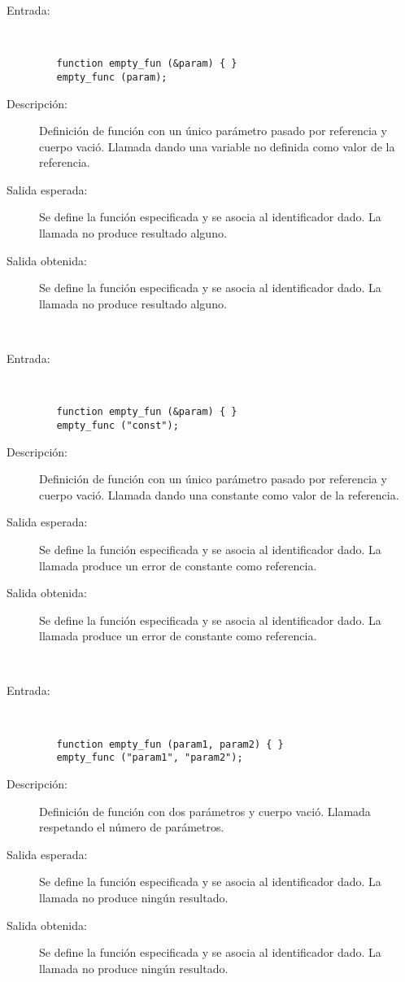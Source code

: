 	\begin{description}
		\item [Entrada:] \hfill \\
\begin{lstlisting}
   function empty_fun (&param) { } 
   empty_func (param);
\end{lstlisting}
		\item [Descripción:] Definición de función con un único parámetro pasado por referencia y cuerpo vació. Llamada dando una variable no definida como valor de la referencia.
		\item [Salida esperada:] Se define la función especificada y se asocia al identificador dado. La llamada no produce resultado alguno.
		\item [Salida obtenida:] Se define la función especificada y se asocia al identificador dado. La llamada no produce resultado alguno.
	\end{description}
\hfil \\
	\begin{description}
		\item [Entrada:] \hfill \\
\begin{lstlisting}
   function empty_fun (&param) { } 
   empty_func ("const");
\end{lstlisting}
		\item [Descripción:] Definición de función con un único parámetro pasado por referencia y cuerpo vació. Llamada dando una constante como valor de la referencia.
		\item [Salida esperada:] Se define la función especificada y se asocia al identificador dado. La llamada produce un error de constante como referencia.
		\item [Salida obtenida:] Se define la función especificada y se asocia al identificador dado. La llamada produce un error de constante como referencia.
	\end{description}
\hfil \\
	\begin{description}
		\item [Entrada:] \hfill \\
\begin{lstlisting}
   function empty_fun (param1, param2) { } 
   empty_func ("param1", "param2");
\end{lstlisting}
		\item [Descripción:] Definición de función con dos parámetros y cuerpo vació. Llamada respetando el número de parámetros.
		\item [Salida esperada:] Se define la función especificada y se asocia al identificador dado. La llamada no produce ningún resultado.
		\item [Salida obtenida:] Se define la función especificada y se asocia al identificador dado. La llamada no produce ningún resultado.
	\end{description}
